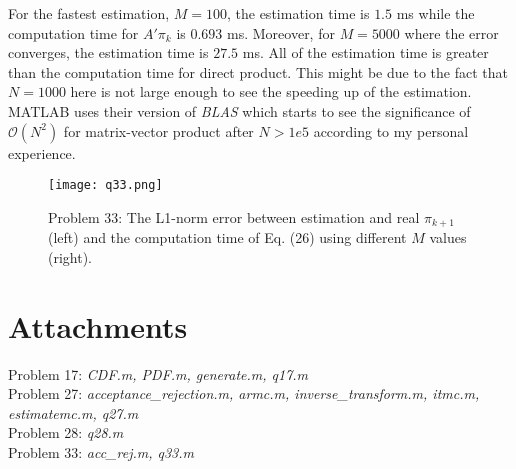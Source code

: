 \documentclass[a4paper, 11pt]{article}
\begin{document}
For the fastest estimation, $M=100$, the estimation time is $1.5$ ms while the computation time for $A'\pi_k$ is $0.693$ ms. Moreover, for $M=5000$ where the error converges, the estimation time is $27.5$ ms. All of the estimation time is greater than the computation time for direct product. This might be due to the fact that $N=1000$ here is not large enough to see the speeding up of the estimation. MATLAB uses their version of \textit{BLAS} which starts to see the significance of $\mathcal{O}(N^2)$ for matrix-vector product after $N>1e5$ according to my personal experience. 


\begin{figure}
	\begin{center}
		\texttt{[image: q33.png]}
		\caption{Problem 33: The L1-norm error between estimation and real $\pi_{k+1}$ (left) and the computation time of Eq. (26) using different $M$ values (right).  }
	\end{center}
\end{figure}


\section*{Attachments}
	Problem 17: \textit{CDF.m, PDF.m, generate.m, q17.m} \\
	Problem 27: \textit{acceptance\_rejection.m, armc.m, inverse\_transform.m, itmc.m, estimatemc.m, q27.m}\\
	Problem 28: \textit{q28.m}\\
	Problem 33: \textit{acc\_rej.m, q33.m}\\

\end{document}

